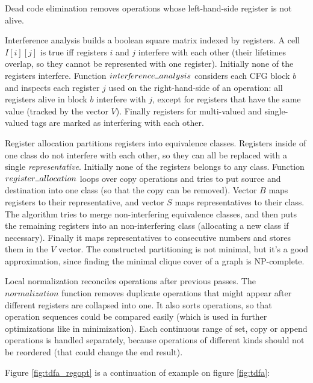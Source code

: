 \documentclass[]{article}
\newcommand{\Xund}{\rule{.5em}{.5pt}}
\begin{document}
Dead code elimination removes operations whose left-hand-side register is not alive.
\medskip

Interference analysis builds a boolean square matrix indexed by registers.
A cell $I[i][j]$ is true iff registers $i$ and $j$ interfere with each other
(their lifetimes overlap, so they cannot be represented with one register).
Initially none of the registers interfere.
Function $inter\!f\!erence \Xund analysis$ considers each CFG block $b$ and inspects each register $j$ used on the right-hand-side of an operation:
all registers alive in block $b$ interfere with $j$,
except for registers that have the same value (tracked by the vector $V$).
Finally registers for multi-valued and single-valued tags are marked as interfering with each other.
\medskip

Register allocation partitions registers into equivalence classes.
Registers inside of one class do not interfere with each other, so they can all be replaced with a single \emph{representative}.
Initially none of the registers belongs to any class.
Function $register \Xund allocation$ loops over copy operations
and tries to put source and destination into one class (so that the copy can be removed).
Vector $B$ maps registers to their representative, and vector $S$ maps representatives to their class.
The algorithm tries to merge non-interfering equivalence classes,
and then puts the remaining registers into an non-interfering class (allocating a new class if necessary).
Finally it maps representatives to consecutive numbers and stores them in the $V$ vector.
The constructed partitioning is not minimal, but it's a good approximation,
since finding the minimal clique cover of a graph is NP-complete.
\medskip

Local normalization reconciles operations after previous passes.
The $normalization$ function removes duplicate operations that might appear after different registers are collapsed into one.
It also sorts operations, so that operation sequences could be compared easily
(which is used in further optimizations like in minimization).
Each continuous range of set, copy or append operations is handled separately,
because operations of different kinds should not be reordered (that could change the end result).
\medskip

Figure \ref{fig:tdfa_regopt} is a continuation of example on figure \ref{fig:tdfa}:
\medskip
\end{document}
